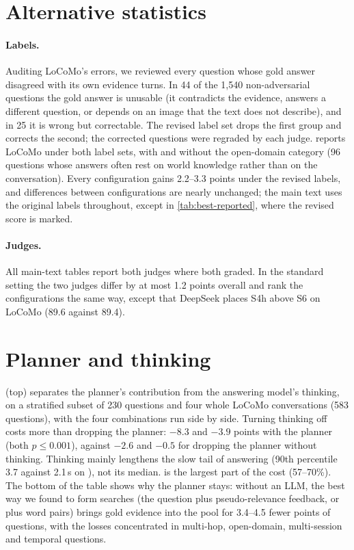 




\section{Alternative statistics}
\label{app:labels}

\paragraph{Labels.}
Auditing LoCoMo's errors, we reviewed every question whose gold answer disagreed with its own evidence turns.
In 44 of the 1,540 non-adversarial questions the gold answer is unusable (it contradicts the evidence, answers a different question, or depends on an image that the text does not describe), and in 25 it is wrong but correctable.
The revised label set drops the first group and corrects the second; the corrected questions were regraded by each judge.
 reports LoCoMo under both label sets, with and without the open-domain category (96 questions whose answers often rest on world knowledge rather than on the conversation).
Every configuration gains 2.2--3.3 points under the revised labels, and differences between configurations are nearly unchanged; the main text uses the original labels throughout, except in \cref{tab:best-reported}, where the revised score is marked.



\paragraph{Judges.}
All main-text tables report both judges where both graded.
In the standard setting the two judges differ by at most 1.2 points overall and rank the configurations the same way, except that DeepSeek places S4h above S6 on LoCoMo (89.6 against 89.4).



\section{Planner and thinking}
\label{app:combos}

 (top) separates the planner's contribution from the answering model's thinking, on a stratified subset of 230 \lme{} questions and four whole LoCoMo conversations (583 questions), with the four combinations run side by side.
Turning thinking off costs more than dropping the planner: $-8.3$ and $-3.9$ points with the planner (both $p\le0.001$), against $-2.6$ and $-0.5$ for dropping the planner without thinking.
Thinking mainly lengthens the slow tail of answering (90th percentile 3.7 against 2.1\,s on \lme), not its median.
\jev{} is the largest part of the cost (57--70\%).
The bottom of the table shows why the planner stays: without an LLM, the best way we found to form searches (the question plus pseudo-relevance feedback, or plus word pairs) brings gold evidence into the pool for 3.4--4.5 fewer points of questions, with the losses concentrated in multi-hop, open-domain, multi-session and temporal questions.

